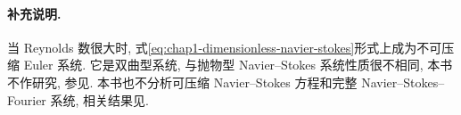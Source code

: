 \paragraph{补充说明.}
\label{subsec:chap1-incompressible-comments}
当 Reynolds 数很大时, 式\eqref{eq:chap1-dimensionless-navier-stokes}形式上成为不可压缩 Euler 系统. 它是双曲型系统, 与抛物型 Navier--Stokes 系统性质很不相同, 本书不作研究, 参见. 本书也不分析可压缩 Navier--Stokes 方程和完整 Navier--Stokes--Fourier 系统, 相关结果见.
